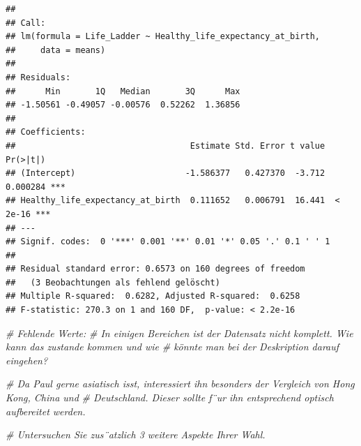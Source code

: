 \documentclass[
]{article}
\newenvironment{Shaded}{\begin{snugshade}}{\end{snugshade}}
\newcommand{\CommentTok}[1]{\textcolor[rgb]{0.56,0.35,0.01}{\textit{#1}}}
\begin{document}
\begin{verbatim}
## 
## Call:
## lm(formula = Life_Ladder ~ Healthy_life_expectancy_at_birth, 
##     data = means)
## 
## Residuals:
##      Min       1Q   Median       3Q      Max 
## -1.50561 -0.49057 -0.00576  0.52262  1.36856 
## 
## Coefficients:
##                                   Estimate Std. Error t value Pr(>|t|)    
## (Intercept)                      -1.586377   0.427370  -3.712 0.000284 ***
## Healthy_life_expectancy_at_birth  0.111652   0.006791  16.441  < 2e-16 ***
## ---
## Signif. codes:  0 '***' 0.001 '**' 0.01 '*' 0.05 '.' 0.1 ' ' 1
## 
## Residual standard error: 0.6573 on 160 degrees of freedom
##   (3 Beobachtungen als fehlend gelöscht)
## Multiple R-squared:  0.6282, Adjusted R-squared:  0.6258 
## F-statistic: 270.3 on 1 and 160 DF,  p-value: < 2.2e-16
\end{verbatim}

\begin{Shaded}
\begin{Highlighting}[]
\CommentTok{\# Fehlende Werte:}
\CommentTok{\# In einigen Bereichen ist der Datensatz nicht komplett. Wie kann das zustande kommen und wie}
\CommentTok{\# könnte man bei der Deskription darauf eingehen?}
\end{Highlighting}
\end{Shaded}

\begin{Shaded}
\begin{Highlighting}[]
\CommentTok{\# Da Paul gerne asiatisch isst, interessiert ihn besonders der Vergleich von Hong Kong, China und}
\CommentTok{\# Deutschland. Dieser sollte f¨ur ihn entsprechend optisch aufbereitet werden.}
\end{Highlighting}
\end{Shaded}

\begin{Shaded}
\begin{Highlighting}[]
\CommentTok{\# Untersuchen Sie zus¨atzlich 3 weitere Aspekte Ihrer Wahl.}
\end{Highlighting}
\end{Shaded}
\end{document}
